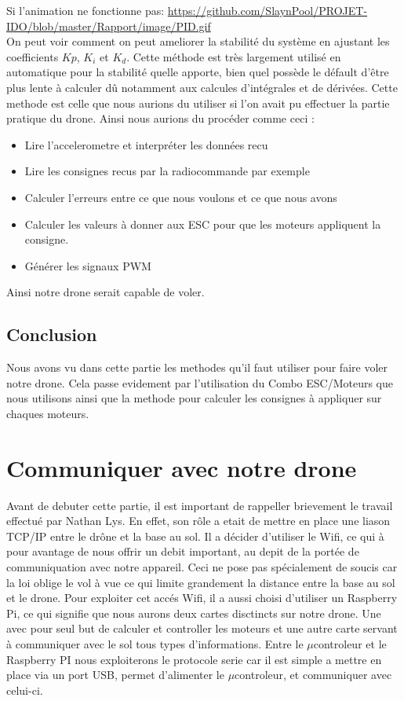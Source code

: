 \documentclass[10pt,a4paper]{article}
\begin{document}
 Si l'animation ne fonctionne pas: \url{https://github.com/SlaynPool/PROJET-IDO/blob/master/Rapport/image/PID.gif}
 \\On peut voir comment on peut ameliorer la stabilité du système en ajustant les coefficients $Kp$, $K_i$ et $K_d$. Cette méthode est très largement utilisé en automatique pour la stabilité quelle apporte, bien quel possède le défault d'être plus lente à calculer dû notamment aux calcules d'intégrales et de dérivées. Cette methode est celle que nous aurions du utiliser si l'on avait pu effectuer la partie pratique du drone. Ainsi nous aurions du procéder comme ceci : 
 \begin{itemize}
  \item Lire l'accelerometre et interpréter les données recu
  \item Lire les consignes recus par la radiocommande par exemple
  \item Calculer l'erreurs entre ce que nous voulons et ce que nous avons
  \item Calculer les valeurs à donner aux ESC pour que les moteurs appliquent la consigne.
  \item Générer les signaux PWM
 \end{itemize}
 Ainsi notre drone serait capable de voler.
\subsection{Conclusion}
Nous avons vu dans cette partie les methodes qu'il faut utiliser pour faire voler notre drone. Cela passe evidement par l'utilisation du Combo ESC/Moteurs que nous utilisons ainsi que la methode pour calculer les consignes à appliquer sur chaques moteurs.

\newpage
\section{Communiquer avec notre drone}
Avant de debuter cette partie, il est important de rappeller brievement le travail effectué par Nathan Lys. En effet, son rôle a etait de mettre en place une liason TCP/IP entre le drône et la base au sol. Il a décider d'utiliser le Wifi, ce qui à pour avantage de nous offrir un debit important, au depit de la portée de communiquation avec notre appareil. Ceci ne pose pas spécialement de soucis car la loi oblige le vol à vue ce qui limite grandement la distance entre la base au sol et le drone. Pour exploiter cet accés Wifi, il a aussi choisi d'utiliser un Raspberry Pi, ce qui signifie que nous aurons deux cartes disctincts sur notre drone. Une avec pour seul but de calculer et controller les moteurs et une autre carte servant à communiquer avec le sol tous types d'informations. Entre le $\mu$controleur et le Raspberry PI nous exploiterons le protocole serie car il est simple a mettre en place via un port USB, permet d'alimenter le $\mu$controleur, et communiquer avec celui-ci. 
\end{document}
